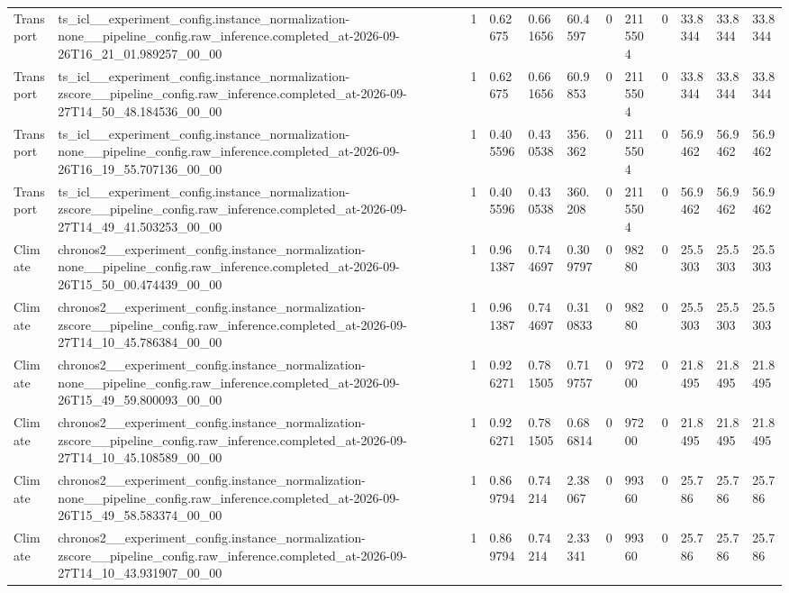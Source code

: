 \begin{tabular}{llllllllllll}
Transport & ts\_icl\_\_experiment\_config.instance\_normalization-none\_\_pipeline\_config.raw\_inference.completed\_at-2026-09-26T16\_21\_01.989257\_00\_00 & 1 & 0.62675 & 0.661656 & 60.4597 & 0 & 2115504 & 0 & 33.8344 & 33.8344 & 33.8344 \\
Transport & ts\_icl\_\_experiment\_config.instance\_normalization-zscore\_\_pipeline\_config.raw\_inference.completed\_at-2026-09-27T14\_50\_48.184536\_00\_00 & 1 & 0.62675 & 0.661656 & 60.9853 & 0 & 2115504 & 0 & 33.8344 & 33.8344 & 33.8344 \\
Transport & ts\_icl\_\_experiment\_config.instance\_normalization-none\_\_pipeline\_config.raw\_inference.completed\_at-2026-09-26T16\_19\_55.707136\_00\_00 & 1 & 0.405596 & 0.430538 & 356.362 & 0 & 2115504 & 0 & 56.9462 & 56.9462 & 56.9462 \\
Transport & ts\_icl\_\_experiment\_config.instance\_normalization-zscore\_\_pipeline\_config.raw\_inference.completed\_at-2026-09-27T14\_49\_41.503253\_00\_00 & 1 & 0.405596 & 0.430538 & 360.208 & 0 & 2115504 & 0 & 56.9462 & 56.9462 & 56.9462 \\
Climate & chronos2\_\_experiment\_config.instance\_normalization-none\_\_pipeline\_config.raw\_inference.completed\_at-2026-09-26T15\_50\_00.474439\_00\_00 & 1 & 0.961387 & 0.744697 & 0.309797 & 0 & 98280 & 0 & 25.5303 & 25.5303 & 25.5303 \\
Climate & chronos2\_\_experiment\_config.instance\_normalization-zscore\_\_pipeline\_config.raw\_inference.completed\_at-2026-09-27T14\_10\_45.786384\_00\_00 & 1 & 0.961387 & 0.744697 & 0.310833 & 0 & 98280 & 0 & 25.5303 & 25.5303 & 25.5303 \\
Climate & chronos2\_\_experiment\_config.instance\_normalization-none\_\_pipeline\_config.raw\_inference.completed\_at-2026-09-26T15\_49\_59.800093\_00\_00 & 1 & 0.926271 & 0.781505 & 0.719757 & 0 & 97200 & 0 & 21.8495 & 21.8495 & 21.8495 \\
Climate & chronos2\_\_experiment\_config.instance\_normalization-zscore\_\_pipeline\_config.raw\_inference.completed\_at-2026-09-27T14\_10\_45.108589\_00\_00 & 1 & 0.926271 & 0.781505 & 0.686814 & 0 & 97200 & 0 & 21.8495 & 21.8495 & 21.8495 \\
Climate & chronos2\_\_experiment\_config.instance\_normalization-none\_\_pipeline\_config.raw\_inference.completed\_at-2026-09-26T15\_49\_58.583374\_00\_00 & 1 & 0.869794 & 0.74214 & 2.38067 & 0 & 99360 & 0 & 25.786 & 25.786 & 25.786 \\
Climate & chronos2\_\_experiment\_config.instance\_normalization-zscore\_\_pipeline\_config.raw\_inference.completed\_at-2026-09-27T14\_10\_43.931907\_00\_00 & 1 & 0.869794 & 0.74214 & 2.33341 & 0 & 99360 & 0 & 25.786 & 25.786 & 25.786 \\

\end{tabular}
